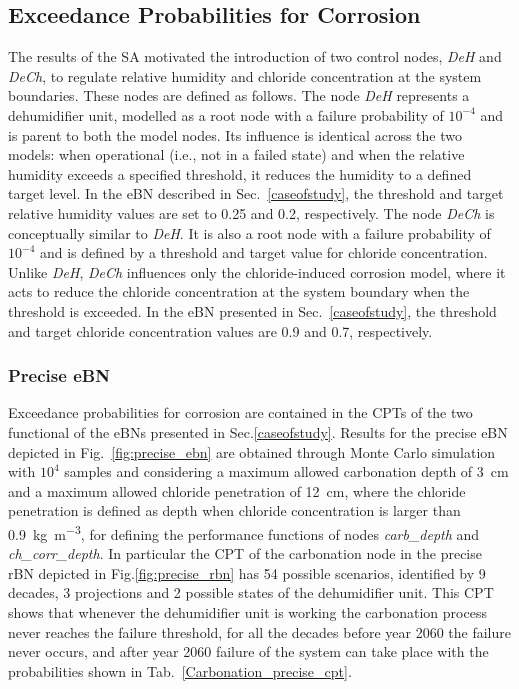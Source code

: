 \subsection{Exceedance Probabilities for Corrosion}

The results of the SA motivated the introduction of two control nodes, \textit{DeH} and \textit{DeCh}, to regulate relative humidity and chloride concentration at the system boundaries. 
These nodes are defined as follows.
The node \textit{DeH} represents a dehumidifier unit, modelled as a root node with a failure probability of $10^{-4}$ and is parent to both the model nodes.
Its influence is identical across the two models: when operational (i.e., not in a failed state) and when the relative humidity exceeds a specified threshold, it reduces the humidity to a defined target level. 
In the eBN described in Sec.~\ref{caseofstudy}, the threshold and target relative humidity values are set to 0.25 and 0.2, respectively.
The node \textit{DeCh} is conceptually similar to \textit{DeH}.
It is also a root node with a failure probability of $10^{-4}$ and is defined by a threshold and target value for chloride concentration. 
Unlike \textit{DeH}, \textit{DeCh} influences only the chloride-induced corrosion model, where it acts to reduce the chloride concentration at the system boundary when the threshold is exceeded. 
In the eBN presented in Sec.~\ref{caseofstudy}, the threshold and target chloride concentration values are 0.9 and 0.7, respectively.\\

\subsubsection{Precise eBN}
Exceedance probabilities for corrosion are contained in the CPTs of the two functional of the eBNs presented in Sec.\ref{caseofstudy}. 
Results for the precise eBN depicted in Fig.~\ref{fig:precise_ebn} are obtained through Monte Carlo simulation with $10^4$ samples and considering a maximum allowed carbonation depth of \SI{3}{\centi\meter} and a maximum allowed chloride penetration of \SI{12}{\centi\meter}, where the chloride penetration is defined as depth when chloride concentration is larger than \SI{0.9}{\kilogram\per\cubic\meter}, for defining the performance functions of nodes \textit{carb_depth} and \textit{ch_corr_depth}.
In particular the CPT of the carbonation node in the precise rBN depicted in Fig.\ref{fig:precise_rbn} has 54 possible scenarios, identified by 9 decades, 3 projections and 2 possible states of the dehumidifier unit. This CPT shows that whenever the dehumidifier unit is working the carbonation process never reaches the failure threshold, for all the decades before year 2060 the failure never occurs, and after year 2060 failure of the system can take place with the probabilities shown in Tab.~\ref{Carbonation_precise_cpt}.

